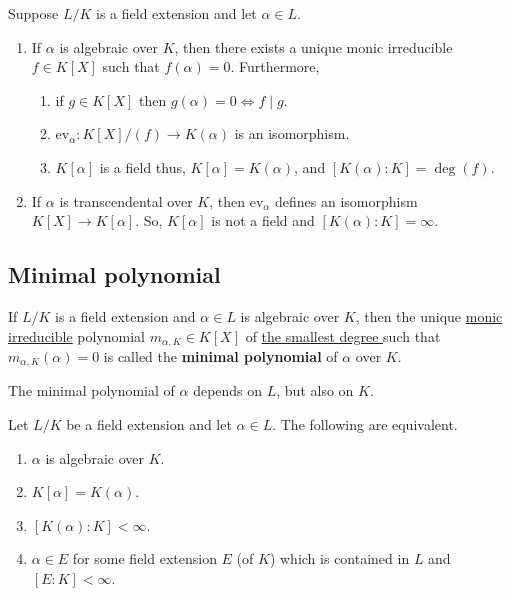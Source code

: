 \documentclass[12pt, a4paper]{article}
\begin{document}
\begin{mdthm}
    Suppose \(L/K\) is a field extension and let \(\alpha\in L\).
    \begin{enumerate}
        \item If \(\alpha\) is algebraic over \(K\), then there exists a unique monic irreducible \(f\in K[X]\) such that \(f(\alpha)=0\). Furthermore,
        \begin{enumerate}
            \item if \(g\in K[X]\) then \(g(\alpha)=0 \iff f\mid g\).
            \item \(\text{ev}_{\alpha} :K[X]/(f)\to K(\alpha)\) is an isomorphism.
            \item \(K[\alpha]\) is a field thus, \(K[\alpha]=K(\alpha)\), and \([K(\alpha):K]=\deg(f)\).
        \end{enumerate}
        \item If \(\alpha\) is transcendental over \(K\), then \(\text{ev}_\alpha\) defines an isomorphism \(K[X]\to K[\alpha]\). So, \(K[\alpha]\) is not a field and \([K(\alpha):K]=\infty\).
    \end{enumerate}
\end{mdthm}

\subsection{Minimal polynomial}

\begin{definition}
    If \(L/K\) is a field extension and \(\alpha\in L\) is algebraic over \(K\), then the unique \ul{monic} \ul{irreducible} polynomial \(m_{\alpha,K} \in K[X]\) of \ul{the smallest degree }such that \(m_{\alpha,K}(\alpha)=0\) is called the \textbf{minimal polynomial} of \(\alpha\) over \(K\). 
\end{definition}

\begin{mdremark}
    The minimal polynomial of \(\alpha\) depends on \(L\), but also on \(K\).
\end{mdremark}

\begin{corollary}
    Let \(L/K\) be a field extension and let \(\alpha \in L\). The following are equivalent.
    \begin{enumerate}
        \item \(\alpha\) is algebraic over \(K\).
        \item \(K[\alpha]=K(\alpha)\).
        \item \([K(\alpha):K]<\infty\).
        \item \(\alpha \in E\) for some field extension \(E\) (of \(K\)) which is contained in \(L\) and \([E:K]<\infty\).
    \end{enumerate}
\end{corollary}
\end{document}
